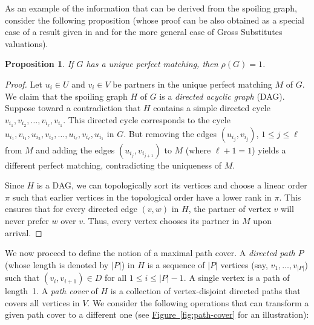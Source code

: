 \documentclass[11pt]{article}
\numberwithin{equation}{section}
\newtheorem{proposition}[theorem]{Proposition}
\theoremstyle{definition}
\theoremstyle{plain}
\newcommand{\expref}[2]{\hyperref[#2]{#1~\ref{#2}}}
\theoremstyle{plain}
\begin{document}
As an example of the information that can be derived from the spoiling graph, consider the following proposition (whose proof can be also obtained as a special case of a result given in \cite{Cohen-AddadEFF16} and \cite{LemeW17} for the more general case of Gross Substitutes valuations).

\begin{proposition}
	\label{prop:dag}
	If $G$ has a unique perfect matching, then $\rho(G)=1$.
\end{proposition}
\begin{proof}
	Let $u_i\in U$ and $v_i \in V$ be partners in the unique perfect matching $M$ of $G$.
	We claim that the spoiling graph $H$ of $G$ is a \emph{directed acyclic graph} (DAG).
	Suppose toward a %
contradiction that $H$ contains a simple directed cycle $v_{i_1},v_{i_2},\ldots, v_{i_\ell},v_{i_1}$.
	This directed cycle corresponds to the cycle $u_{i_1},v_{i_1},u_{i_2},v_{i_2},\ldots,u_{i_\ell},v_{i_{\ell}},u_{i_1}$ in $G$.
	But removing the edges $(u_{i_j},v_{i_j})$, $1\leq j\leq \ell$ from $M$ and adding the edges $(u_{i_j},v_{i_{j+1}})$ to $M$ (where $\ell+1=1$) yields a different perfect matching, contradicting the uniqueness of $M$.
	
	Since $H$ is a DAG, we can topologically sort its vertices and choose a linear order $\pi$ such that earlier vertices in the topological order have a lower rank in $\pi$. This ensures that for every directed edge $(v,w)$ in $H$,
%
the partner of vertex $v$  %
will never prefer $w$ over $v$. Thus, every vertex chooses its partner in $M$ upon arrival.
\end{proof}

We now proceed to define the notion of a maximal path cover.
A \emph{directed path} $P$ (whose length is denoted by $|P|$) in $H$ is a sequence of $|P|$ vertices (say, $v_1, \ldots, v_{|P|}$) such that $(v_{i}, v_{i+1}) \in D$ for all $1 \le i \le |P|-1$.  
A single vertex is a path of length~1. %
%
%
%
%
%
%
%
A \emph{path cover} of $H$ is a collection of
%
vertex-disjoint   %
directed paths that covers all vertices in $V$. We consider the following operations that can transform a given path cover to a different one (see \expref{Figure}{fig:path-cover} for an illustration):
\end{document}
